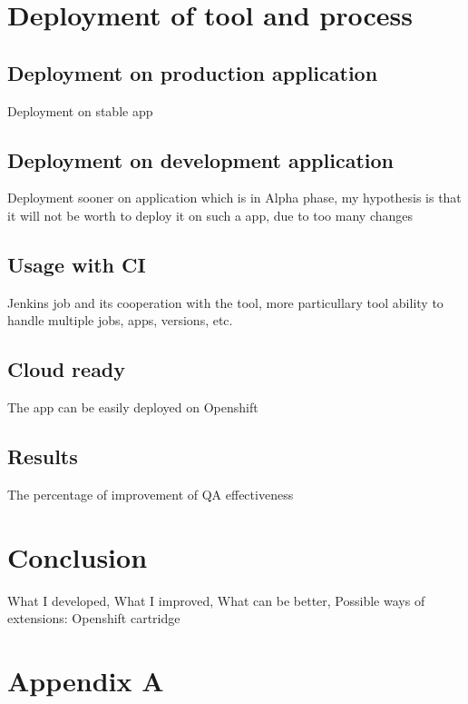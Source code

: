 \documentclass[11pt,oneside,final]{fithesis2}
\begin{document}
\chapter{Deployment of tool and process}

  \section{Deployment on production application}
  Deployment on stable app
  
  \section{Deployment on development application}
  Deployment sooner on application which is in Alpha phase, my hypothesis is that it will not be worth to deploy it on such a app, due to too many changes
  
  \section{Usage with CI}
  Jenkins job and its cooperation with the tool, more particullary tool ability to handle multiple jobs, apps, versions, etc.
  
  \section{Cloud ready}
  The app can be easily deployed on Openshift
  
  \section{Results}
  The percentage of improvement of QA effectiveness
  
\chapter{Conclusion}
What I developed, What I improved, What can be better, Possible ways of extensions: Openshift cartridge
   
   
\appendix
\chapter{Appendix A}
\label{appendeix:a}
\end{document}

